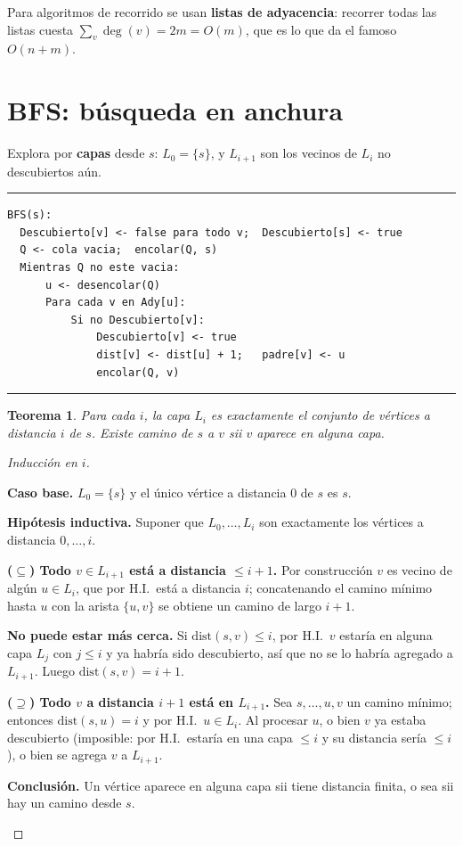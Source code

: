 \documentclass[11pt,a4paper]{article}
\theoremstyle{plain}
\newtheorem{teorema}{Teorema}[section]
\theoremstyle{definition}
\theoremstyle{remark}
\newcommand{\codigoinicio}{\begin{center}\begin{minipage}{0.93\textwidth}%
  \hrule\vspace{3pt}}
\newcommand{\codigofin}{\vspace{-4pt}\hrule\end{minipage}\end{center}}
\begin{document}
\noindent Para algoritmos de recorrido se usan \textbf{listas de adyacencia}: recorrer
todas las listas cuesta $\sum_v \deg(v)=2m=O(m)$, que es lo que da el famoso $O(n+m)$.

\section{BFS: búsqueda en anchura}

Explora por \textbf{capas} desde $s$: $L_0=\{s\}$, y $L_{i+1}$ son los vecinos de
$L_i$ no descubiertos aún.

\codigoinicio
\begin{verbatim}
BFS(s):
  Descubierto[v] <- false para todo v;  Descubierto[s] <- true
  Q <- cola vacia;  encolar(Q, s)
  Mientras Q no este vacia:
      u <- desencolar(Q)
      Para cada v en Ady[u]:
          Si no Descubierto[v]:
              Descubierto[v] <- true
              dist[v] <- dist[u] + 1;   padre[v] <- u
              encolar(Q, v)
\end{verbatim}
\codigofin

\begin{teorema}\label{t:bfs-capas}
Para cada $i$, la capa $L_i$ es exactamente el conjunto de vértices a distancia $i$
de $s$. Existe camino de $s$ a $v$ sii $v$ aparece en alguna capa.
\end{teorema}
\begin{proof}[Inducción en $i$]
\begin{pasos}
\item \textbf{Caso base.} $L_0=\{s\}$ y el único vértice a distancia $0$ de $s$ es $s$.
\item \textbf{Hipótesis inductiva.} Suponer que $L_0,\dots,L_i$ son exactamente los
vértices a distancia $0,\dots,i$.
\item \textbf{($\subseteq$) Todo $v\in L_{i+1}$ está a distancia $\le i+1$.} Por
construcción $v$ es vecino de algún $u\in L_i$, que por H.I.\ está a distancia $i$;
concatenando el camino mínimo hasta $u$ con la arista $\{u,v\}$ se obtiene un camino de
largo $i+1$.
\item \textbf{No puede estar más cerca.} Si $\mathrm{dist}(s,v)\le i$, por H.I.\ $v$
estaría en alguna capa $L_j$ con $j\le i$ y ya habría sido descubierto, así que no se
lo habría agregado a $L_{i+1}$. Luego $\mathrm{dist}(s,v)=i+1$.
\item \textbf{($\supseteq$) Todo $v$ a distancia $i+1$ está en $L_{i+1}$.} Sea
$s,\dots,u,v$ un camino mínimo; entonces $\mathrm{dist}(s,u)=i$ y por H.I.\ $u\in L_i$.
Al procesar $u$, o bien $v$ ya estaba descubierto (imposible: por H.I.\ estaría en una
capa $\le i$ y su distancia sería $\le i$), o bien se agrega $v$ a $L_{i+1}$.
\item \textbf{Conclusión.} Un vértice aparece en alguna capa sii tiene distancia finita,
o sea sii hay un camino desde $s$. \qedhere
\end{pasos}
\end{proof}
\end{document}
